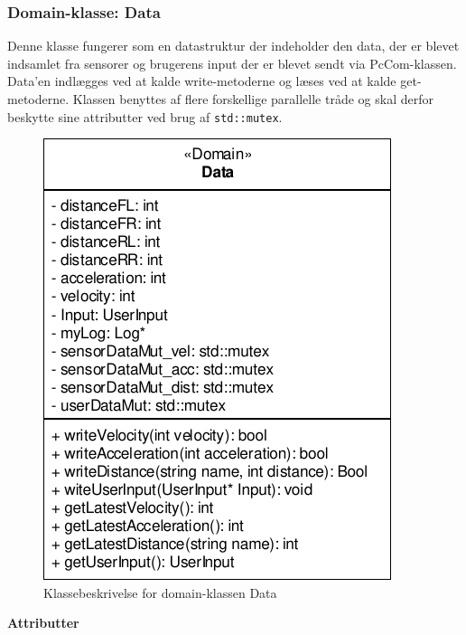 \subsubsection{Domain-klasse: Data}

Denne klasse fungerer som en datastruktur der indeholder den data, der er blevet indsamlet fra sensorer og brugerens input der er blevet sendt via PcCom-klassen. Data'en indlægges ved at kalde write-metoderne og læses ved at kalde get-metoderne. Klassen benyttes af flere forskellige parallelle tråde og skal derfor beskytte sine attributter ved brug af \texttt{std::mutex}.

\begin{figure}[h]
\centering
\includegraphics[]{../fig/diagrammer/bil/cd_data.pdf}
\caption{Klassebeskrivelse for domain-klassen Data}
\label{fig:cd_data}
\end{figure}

\clearpage

\textbf{Attributter}

